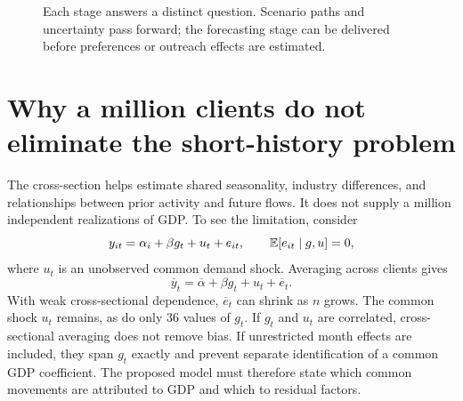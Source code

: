 \begin{figure}[ht]
\centering
{}
\caption{Each stage answers a distinct question. Scenario paths and uncertainty pass forward; the forecasting stage can be delivered before preferences or outreach effects are estimated.}
\end{figure}

\section{Why a million clients do not eliminate the short-history problem}
The cross-section helps estimate shared seasonality, industry differences, and relationships between prior activity and future flows. It does not supply a million independent realizations of GDP. To see the limitation, consider
\begin{equation}
y_{it}=\alpha_i+\beta g_t+u_t+e_{it},
\qquad \mathbb E[e_{it}\mid g,u]=0,
\end{equation}
where $u_t$ is an unobserved common demand shock. Averaging across clients gives
\begin{equation}
\overline y_t=\overline\alpha+\beta g_t+u_t+\overline e_t.
\end{equation}
With weak cross-sectional dependence, $\overline e_t$ can shrink as $n$ grows. The common shock $u_t$ remains, as do only 36 values of $g_t$. If $g_t$ and $u_t$ are correlated, cross-sectional averaging does not remove bias. If unrestricted month effects are included, they span $g_t$ exactly and prevent separate identification of a common GDP coefficient. The proposed model must therefore state which common movements are attributed to GDP and which to residual factors.

